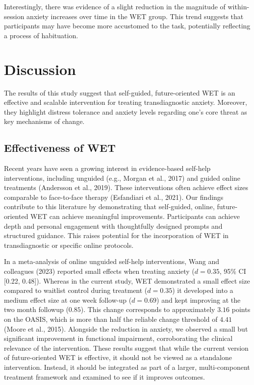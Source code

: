 \documentclass[
  man,floatsintext]{apa7}
\begin{document}
Interestingly, there was evidence of a slight reduction in the magnitude of within-session anxiety increases over time in the WET group.
This trend suggests that participants may have become more accustomed to the task, potentially reflecting a process of habituation.

\section{Discussion}\label{discussion}

The results of this study suggest that self-guided, future-oriented WET is an effective and scalable intervention for treating transdiagnostic anxiety.
Moreover, they highlight distress tolerance and anxiety levels regarding one's core threat as key mechanisms of change.

\subsection{Effectiveness of WET}\label{effectiveness-of-wet}

Recent years have seen a growing interest in evidence-based self-help interventions, including unguided (e.g., Morgan et al., 2017) and guided online treatments (Andersson et al., 2019).
These interventions often achieve effect sizes comparable to face-to-face therapy (Esfandiari et al., 2021).
Our findings contribute to this literature by demonstrating that self-guided, online, future-oriented WET can achieve meaningful improvements.
Participants can achieve depth and personal engagement with thoughtfully designed prompts and structured guidance.
This raises potential for the incorporation of WET in transdiagnostic or specific online protocols.

In a meta-analysis of online unguided self-help interventions, Wang and colleagues (2023)
reported small effects when treating anxiety (\(d = 0.35\), 95\% CI {[}0.22, 0.48{]}).
Whereas in the current study, WET demonstrated a small effect size compared to waitlist control during treatment (\(d = 0.35\)) it developed into a medium effect size at one week follow-up (\(d = 0.69\)) and kept improving at the two month followup (\(0.85\)).
This change corresponds to approximately \(3.16\) points on the OASIS, which is more than half the reliable change threshold of \(4.41\) (Moore et al., 2015).
Alongside the reduction in anxiety, we observed a small but significant improvement in functional impairment, corroborating the clinical relevance of the intervention.
These results suggest that while the current version of future-oriented WET is effective, it should not be viewed as a standalone intervention.
Instead, it should be integrated as part of a larger, multi-component treatment framework and examined to see if it improves outcomes.
\end{document}
